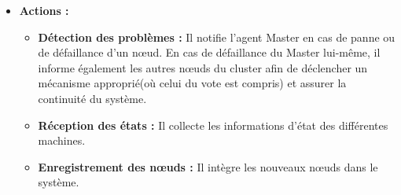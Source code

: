 \documentclass[12pt,a4paper]{report}
\theoremstyle{definition}
\begin{document}
\begin{enumerate}
\begin{itemize}
    \item [$\bullet$]\textbf{Actions :}
    \begin{itemize}
       \item[$-$] \textbf{Détection des problèmes :} Il notifie l’agent Master en cas de panne ou de défaillance d’un nœud. En cas de défaillance du Master lui-même, il informe également les autres nœuds du cluster afin de déclencher un mécanisme approprié(où celui du vote est compris) et assurer la continuité du système.
        
        \item [$-$]\textbf{Réception des états :} Il collecte les informations d’état des différentes machines.
        
        \item[$-$] \textbf{Enregistrement des nœuds :} Il intègre les nouveaux nœuds dans le système.
    \end{itemize}
\end{itemize}

\end{enumerate}
\end{document}
